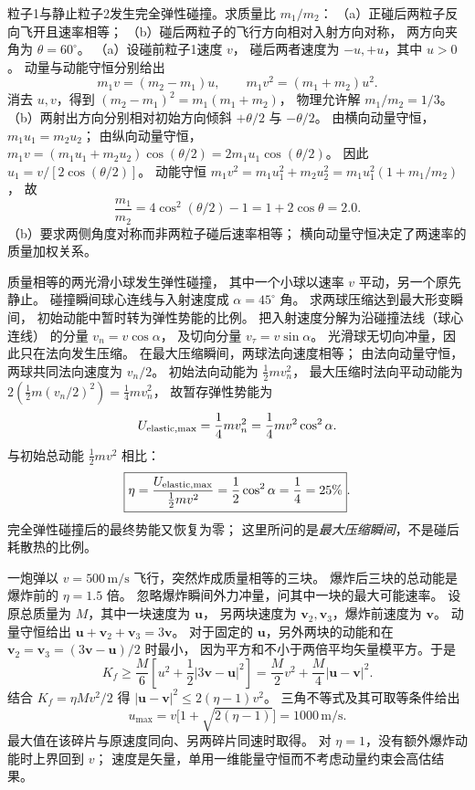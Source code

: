 粒子1与静止粒子2发生完全弹性碰撞。求质量比 $m_1/m_2$：
（a）正碰后两粒子反向飞开且速率相等；
（b）碰后两粒子的飞行方向相对入射方向对称，
两方向夹角为 $\theta=60^\circ$。
\exsolution
（a）设碰前粒子1速度 $v$，
碰后两者速度为 $-u,+u$，其中 $u>0$。
动量与动能守恒分别给出
\[
m_1v=(m_2-m_1)u,\qquad
m_1v^2=(m_1+m_2)u^2.
\]
消去 $u,v$，得到
$(m_2-m_1)^2=m_1(m_1+m_2)$，
物理允许解
$\boxed{m_1/m_2=1/3}$。
（b）两射出方向分别相对初始方向倾斜
$+\theta/2$ 与 $-\theta/2$。
由横向动量守恒，
$m_1u_1=m_2u_2$；
由纵向动量守恒，
$m_1v=(m_1u_1+m_2u_2)\cos(\theta/2)
=2m_1u_1\cos(\theta/2)$。
因此 $u_1=v/[2\cos(\theta/2)]$。
动能守恒
$m_1v^2=m_1u_1^2+m_2u_2^2
=m_1u_1^2(1+m_1/m_2)$，
故
\[
\boxed{\frac{m_1}{m_2}=4\cos^2(\theta/2)-1
=1+2\cos\theta=2.0}.
\]
\excheck （b）要求两侧角度对称而非两粒子碰后速率相等；
横向动量守恒决定了两速率的质量加权关系。

质量相等的两光滑小球发生弹性碰撞，
其中一个小球以速率 $v$ 平动，另一个原先静止。
碰撞瞬间球心连线与入射速度成
$\alpha=45^\circ$ 角。
求两球压缩达到最大形变瞬间，
初始动能中暂时转为弹性势能的比例。
\exsolution
把入射速度分解为沿碰撞法线（球心连线）
的分量 $v_n=v\cos\alpha$，
及切向分量 $v_\tau=v\sin\alpha$。
光滑球无切向冲量，因此只在法向发生压缩。
在最大压缩瞬间，两球法向速度相等；
由法向动量守恒，两球共同法向速度为 $v_n/2$。
初始法向动能为 $\tfrac12mv_n^2$，
最大压缩时法向平动动能为
$2(\tfrac12 m(v_n/2)^2)=\tfrac14mv_n^2$，
故暂存弹性势能为
\[
U_{\rm elastic,max}=\frac14mv_n^2
=\frac14mv^2\cos^2\alpha .
\]
与初始总动能 $\tfrac12 mv^2$ 相比：
\[
\boxed{\eta=
\frac{U_{\rm elastic,max}}{\tfrac12 mv^2}
=\frac12\cos^2\alpha
=\frac14=25\%}.
\]
\excheck 完全弹性碰撞后的最终势能又恢复为零；
这里所问的是\emph{最大压缩瞬间}，不是碰后耗散热的比例。

一炮弹以 $v=500\,\mathrm{m/s}$ 飞行，突然炸成质量相等的三块。
爆炸后三块的总动能是爆炸前的 $\eta=1.5$ 倍。
忽略爆炸瞬间外力冲量，问其中一块的最大可能速率。
\exsolution
设原总质量为 $M$，其中一块速度为 $\bm u$，
另两块速度为 $\bm v_2,\bm v_3$，爆炸前速度为 $\bm v$。
动量守恒给出
$\bm u+\bm v_2+\bm v_3=3\bm v$。
对于固定的 $\bm u$，另外两块的动能和在
$\bm v_2=\bm v_3=(3\bm v-\bm u)/2$ 时最小，
因为平方和不小于两倍平均矢量模平方。于是
\[
 K_f\ge\frac M6\left[
 u^2+\frac12|3\bm v-\bm u|^2\right]
 =\frac M2v^2+\frac M4|\bm u-\bm v|^2 .
\]
结合 $K_f=\eta Mv^2/2$ 得
$|\bm u-\bm v|^2\le2(\eta-1)v^2$。
三角不等式及其可取等条件给出
\[
\boxed{u_{\max}=v\bigl[1+\sqrt{2(\eta-1)}\bigr]
=1000\,\mathrm{m/s}}.
\]
最大值在该碎片与原速度同向、另两碎片同速时取得。
\excheck 对 $\eta=1$，没有额外爆炸动能时上界回到 $v$；
速度是矢量，单用一维能量守恒而不考虑动量约束会高估结果。

